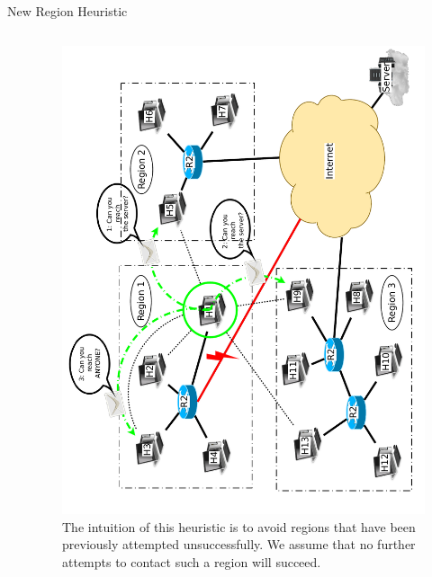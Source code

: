 \documentclass[pdftex]{beamer}
\begin{document}

\begin{frame}{New Region Heuristic}
\begin{columns}
\begin{column}{.5\textwidth}
\begin{algorithm}[H]
\DontPrintSemicolon
{}
\SetAlgoLined
\SetAlgoLongEnd
\scriptsize
{}
\caption{}
\small
\end{algorithm}
\end{column}
	
\begin{column}{.5\textwidth}
\begin{figure}
\includegraphics[height=\textwidth,angle=-90]{new_region_all}
\caption{The intuition of this heuristic is to avoid regions that have been previously attempted unsuccessfully.  We assume that no further attempts to contact such a region will succeed.}
\end{figure}
\end{column}

\end{columns}
\end{frame}
\end{document}
